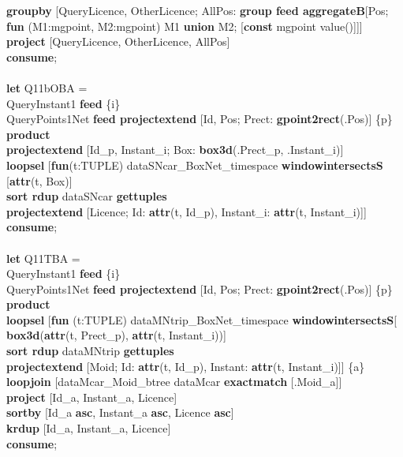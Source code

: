 \documentclass[a4paper]{article}
\newcommand{\op}[1]{\textbf{#1}}
\begin{document}
\begin{scriptsize}
\begin{tabbing}
\>\op{groupby} [QueryLicence, OtherLicence; AllPos: \op{group feed aggregateB}[Pos;\\
\>\>\>\op{fun} (M1:mgpoint, M2:mgpoint) M1 \op{union} M2; [\op{const} mgpoint value()]]]\\
\>\op{project} [QueryLicence, OtherLicence, AllPos]\\
\op{consume};\\
\\
\op{let} Q11bOBA =\\
\>QueryInstant1 \op{feed} \{i\}\\
\>QueryPoints1Net \op{feed projectextend} [Id, Pos; Prect: \op{gpoint2rect}(.Pos)] \{p\}\\
\>\op{product}\\
\>\op{projectextend} [Id\_p, Instant\_i; Box: \op{box3d}(.Prect\_p, .Instant\_i)]\\
\>\op{loopsel} [\op{fun}(t:TUPLE) dataSNcar\_BoxNet\_timespace \op{windowintersectsS} [\op{attr}(t, Box)]\\
\>\>\op{sort rdup} dataSNcar \op{gettuples}\\
\>\>\op{projectextend} [Licence; Id: \op{attr}(t, Id\_p), Instant\_i: \op{attr}(t, Instant\_i)]]\\
\op{consume};\\
\\
\op{let} Q11TBA =\\
\>QueryInstant1 \op{feed} \{i\}\\
\>QueryPoints1Net \op{feed projectextend} [Id, Pos; Prect: \op{gpoint2rect}(.Pos)] \{p\}\\
\>\op{product}\\
\>\op{loopsel} [\op{fun} (t:TUPLE) dataMNtrip\_BoxNet\_timespace \op{windowintersectsS}[\\ 
\>\>\>\op{box3d}(\op{attr}(t, Prect\_p), \op{attr}(t, Instant\_i))]\\
\>\>\op{sort rdup} dataMNtrip \op{gettuples}\\
\>\>\op{projectextend} [Moid; Id: \op{attr}(t, Id\_p), Instant: \op{attr}(t, Instant\_i)]] \{a\}\\
\>\op{loopjoin} [dataMcar\_Moid\_btree dataMcar \op{exactmatch} [.Moid\_a]]\\
\>\op{project} [Id\_a, Instant\_a, Licence]\\
\>\op{sortby} [Id\_a \op{asc}, Instant\_a \op{asc}, Licence \op{asc}]\\
\>\op{krdup} [Id\_a, Instant\_a, Licence]\\
\op{consume};\\

\end{tabbing}
\end{scriptsize}
\end{document}
